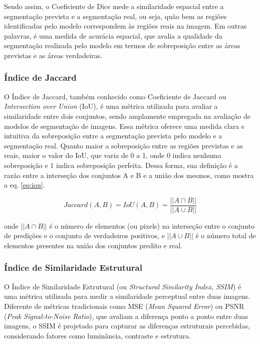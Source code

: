\documentclass[a4,12pt]{horizon-theme}
\begin{document}
Sendo assim, o Coeficiente de Dice mede a similaridade espacial entre a segmentação prevista e a segmentação real, ou seja, quão bem as regiões identificadas pelo modelo correspondem às regiões reais na imagem. Em outras palavras, é uma medida de acurácia espacial, que avalia a qualidade da segmentação realizada pelo modelo em termos de sobreposição entre as áreas previstas e as áreas verdadeiras.

\subsubsection{Índice de Jaccard}
O Índice de Jaccard, também conhecido como Coeficiente de Jaccard ou \emph{Intersection over Union} (IoU), é uma métrica utilizada para avaliar a similaridade entre dois conjuntos, sendo amplamente empregada na avaliação de modelos de segmentação de imagens. Essa métrica oferece uma medida clara e intuitiva da sobreposição entre a segmentação prevista pelo modelo e a segmentação real. Quanto maior a sobreposição entre as regiões previstas e as reais, maior o valor do IoU, que varia de 0 a 1, onde 0 indica nenhuma sobreposição e 1 indica sobreposição perfeita. Dessa forma, sua definição é a razão entre a interseção dos conjuntos A e B e a união dos mesmos, como mostra a eq. \eqref{eq:iou}.

\begin{equation}\label{eq:iou}
  Jaccard(A, B) = IoU(A, B) = \frac{||A \cap B||}{||A \cup B||}
\end{equation}

onde $||A \cap B||$ é o número de elementos (ou pixels) na interseção entre o conjunto de predições e o conjunto de verdadeiros positivos, e $||A \cup B||$ é o número total de elementos presentes na união dos conjuntos predito e real.

\subsubsection{Índice de Similaridade Estrutural}
O Índice de Similaridade Estrutural (ou \emph{Structural Similarity Index, SSIM}) é uma métrica utilizada para medir a similaridade perceptual entre duas imagens. Diferente de métricas tradicionais como MSE (\emph{Mean Squared Error}) ou PSNR (\emph{Peak Signal-to-Noise Ratio}), que avaliam a diferença ponto a ponto entre duas imagens, o SSIM é projetado para capturar as diferenças estruturais percebidas, considerando fatores como luminância, contraste e estrutura.
\end{document}

